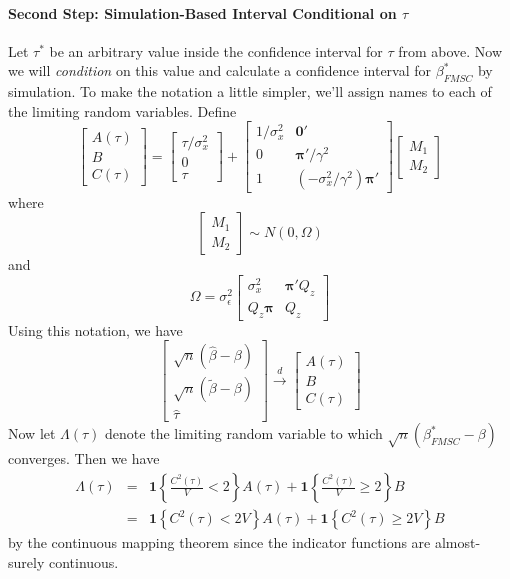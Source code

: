 \documentclass[12pt]{article}
\theoremstyle{definition}
\begin{document}
\paragraph{Second Step: Simulation-Based Interval Conditional on $\tau$}
Let $\tau^*$ be an arbitrary value inside the confidence interval for $\tau$ from above. Now we will \emph{condition} on this value and calculate a confidence interval for $\beta^*_{FMSC}$ by simulation. To make the notation a little simpler, we'll assign names to each of the limiting random variables. Define
$$
\left[\begin{array}
  {c}
  A(\tau) \\ B \\ C(\tau) 
\end{array}\right] = \left[\begin{array}
  {c}
  \tau/\sigma_x^2  \\ 0 \\ \tau
\end{array}\right] + \left[\begin{array}{cc}
1/\sigma_x^2 & \mathbf{0}'\\
  0 & \boldsymbol{\pi}'/\gamma^2\\
  1 & (-\sigma_x^2/\gamma^2) \boldsymbol{\pi}'
  \end{array}
  \right]\left[ \begin{array}
    {c} M_1 \\ M_2
  \end{array}\right]$$
where 
  $$\left[\begin{array}
    {c} M_1 \\ M_2
  \end{array} \right] \sim N(0, \Omega)$$
and 
  $$\Omega = \sigma_\epsilon^2\left[ \begin{array}{cc}
\sigma_x^2
&\boldsymbol{\pi}'Q_z\\
  Q_z \boldsymbol{\pi}&Q_z
  \end{array}\right]$$
Using this notation, we have
 $$\left[
\begin{array}{c}
  \sqrt{n}\left(\widehat{\beta} - \beta\right) \\
  \sqrt{n}\left(\widetilde{\beta} - \beta\right)\\
  \widehat{\tau}
\end{array}
\right] \overset{d}{\rightarrow} \left[\begin{array}
  {c}
  A(\tau) \\ B \\ C(\tau) 
\end{array}\right]$$
Now let $\Lambda(\tau)$ denote the limiting random variable to which $\sqrt{n}\left(\beta^*_{FMSC} - \beta\right)$ converges. Then we have
  \begin{eqnarray*}
    \Lambda(\tau) &=& \mathbf{1}\left\{ \frac{C^2(\tau)}{V} < 2 \right\} A(\tau) +  \mathbf{1}\left\{ \frac{C^2(\tau)}{V} \geq 2 \right\} B\\
    &=& \mathbf{1}\left\{ C^2(\tau)< 2 V \right\} A(\tau) +  \mathbf{1}\left\{ C^2(\tau)\geq 2 V \right\} B
  \end{eqnarray*}
by the continuous mapping theorem since the indicator functions are almost-surely continuous. 
\end{document}

